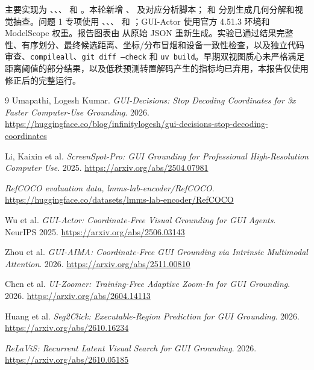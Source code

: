 \documentclass[UTF8,a4paper,11pt,fontset=none]{ctexart}
\newcommand{\code}[1]{\texttt{#1}}
\begin{document}
主要实现为 、、、 和 。本轮新增 、 及对应分析脚本； 和  分别生成几何分解和视觉抽查。问题 1 专项使用 、、、 和 ；GUI-Actor 使用官方 4.51.3 环境和 ModelScope 权重。报告图表由  从原始 JSON 重新生成。实验已通过结果完整性、有序划分、最终候选距离、坐标/分布冒烟和设备一致性检查，以及独立代码审查、\code{compileall}、\code{git diff --check} 和 \code{uv build}。早期双视图质心未严格满足距离阈值的部分结果，以及低秩预测转置解码产生的指标均已弃用，本报告仅使用修正后的完整运行。

\begin{thebibliography}{9}\small
{}
Umapathi, Logesh Kumar. \emph{GUI-Decisions: Stop Decoding Coordinates for 3x Faster Computer-Use Grounding}. 2026.
\url{https://huggingface.co/blog/infinitylogesh/gui-decisions-stop-decoding-coordinates}

Li, Kaixin et al. \emph{ScreenSpot-Pro: GUI Grounding for Professional High-Resolution Computer Use}. 2025.
\url{https://arxiv.org/abs/2504.07981}

\emph{RefCOCO evaluation data, lmms-lab-encoder/RefCOCO}.
\url{https://huggingface.co/datasets/lmms-lab-encoder/RefCOCO}

Wu et al. \emph{GUI-Actor: Coordinate-Free Visual Grounding for GUI Agents}. NeurIPS 2025.
\url{https://arxiv.org/abs/2506.03143}

Zhou et al. \emph{GUI-AIMA: Coordinate-Free GUI Grounding via Intrinsic Multimodal Attention}. 2026.
\url{https://arxiv.org/abs/2511.00810}

Chen et al. \emph{UI-Zoomer: Training-Free Adaptive Zoom-In for GUI Grounding}. 2026.
\url{https://arxiv.org/abs/2604.14113}

Huang et al. \emph{Seg2Click: Executable-Region Prediction for GUI Grounding}. 2026.
\url{https://arxiv.org/abs/2610.16234}

\emph{ReLaViS: Recurrent Latent Visual Search for GUI Grounding}. 2026.
\url{https://arxiv.org/abs/2610.05185}
\end{thebibliography}
\end{document}
